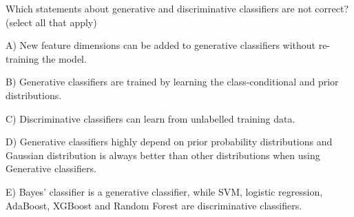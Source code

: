 Which statements about generative and discriminative classifiers are not correct? (select all that apply)


A) New feature dimensions can be added to generative classifiers without re-training the model.


B) Generative classifiers are trained by learning the class-conditional and prior distributions.


C) Discriminative classifiers can learn from unlabelled training data.


D) Generative classifiers highly depend on prior probability distributions and Gaussian distribution is always better than other distributions when using Generative classifiers.


E) Bayes' classifier is a generative classifier, while SVM, logistic regression, AdaBoost, XGBoost and Random Forest are discriminative classifiers.
